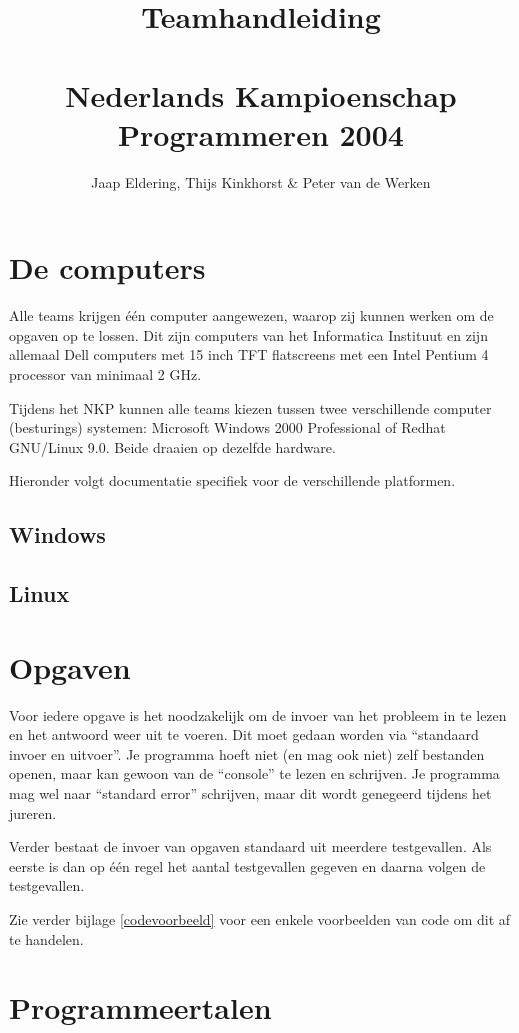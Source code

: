 \documentclass[11pt,titlepage,a4paper]{article}
\title{Teamhandleiding\\~\\Nederlands Kampioenschap Programmeren 2004}
\author{Jaap Eldering, Thijs Kinkhorst \& Peter van de Werken}
\begin{document}
\maketitle

\tableofcontents


\newpage
\section{De computers}

Alle teams krijgen \'e\'en computer aangewezen, waarop zij kunnen
werken om de opgaven op te lossen. Dit zijn computers van het
Informatica Instituut en zijn allemaal Dell computers met 15 inch TFT
flatscreens met een Intel Pentium 4 processor van minimaal 2 GHz.

Tijdens het NKP kunnen alle teams kiezen tussen twee verschillende
computer (besturings) systemen: Microsoft Windows 2000 Professional of
Redhat GNU/Linux 9.0. Beide draaien op dezelfde hardware.

Hieronder volgt documentatie specifiek voor de verschillende platformen.

\subsection{Windows}
\subsection{Linux}


\newpage
\section{Opgaven}

Voor iedere opgave is het noodzakelijk om de invoer van het probleem
in te lezen en het antwoord weer uit te voeren. Dit moet gedaan worden
via ``standaard invoer en uitvoer''. Je programma hoeft niet (en mag
ook niet) zelf bestanden openen, maar kan gewoon van de ``console'' te
lezen en schrijven. Je programma mag wel naar ``standard error''
schrijven, maar dit wordt genegeerd tijdens het jureren.

Verder bestaat de invoer van opgaven standaard uit meerdere
testgevallen. Als eerste is dan op \'e\'en regel het aantal
testgevallen gegeven en daarna volgen de testgevallen.

Zie verder bijlage \ref{codevoorbeeld} voor een enkele voorbeelden van
code om dit af te handelen.


\newpage
\section{Programmeertalen}
\end{document}
